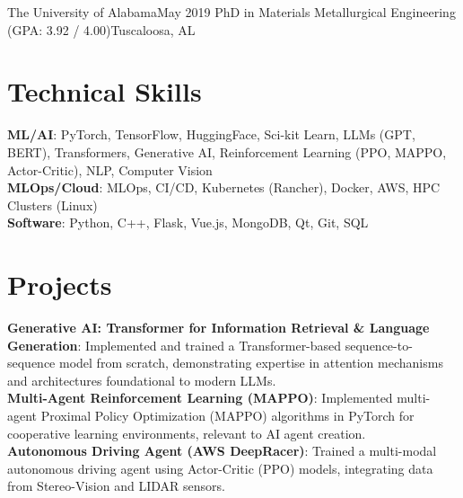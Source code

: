     \resumeSubheading
    {The University of Alabama}{May 2019}
    {PhD in Materials Metallurgical Engineering (GPA: 3.92 / 4.00)}{Tuscaloosa, AL }
    \resumeItemListStart
    \resumeItemListEnd

    \resumeSubHeadingListEnd

\section{Technical Skills}
    \begin{itemize}[leftmargin=0.15in, label={}]
  \small{\item{
    \textbf{ML/AI}{: PyTorch, TensorFlow, HuggingFace, Sci-kit Learn, LLMs (GPT, BERT), Transformers, Generative AI, Reinforcement Learning (PPO, MAPPO, Actor-Critic), NLP, Computer Vision} \\
    \textbf{MLOps/Cloud}{: MLOps, CI/CD, Kubernetes (Rancher), Docker, AWS, HPC Clusters (Linux)} \\
    \textbf{Software}{: Python, C++, Flask, Vue.js, MongoDB, Qt, Git, SQL} \\
  }}
    \end{itemize}


  \section{Projects}
    \begin{itemize}[leftmargin=0.15in, label={}]
      \small{\item{
        \textbf{Generative AI: Transformer for Information Retrieval \& Language Generation}{: Implemented and trained a Transformer-based sequence-to-sequence model from scratch, demonstrating expertise in attention mechanisms and architectures foundational to modern LLMs.} \\
        \textbf{Multi-Agent Reinforcement Learning (MAPPO)}{: Implemented multi-agent Proximal Policy Optimization (MAPPO) algorithms in PyTorch for cooperative learning environments, relevant to AI agent creation.} \\
        \textbf{Autonomous Driving Agent (AWS DeepRacer)}{: Trained a multi-modal autonomous driving agent using Actor-Critic (PPO) models, integrating data from Stereo-Vision and LIDAR sensors.} \\
      }}
      \end{itemize}

% 


